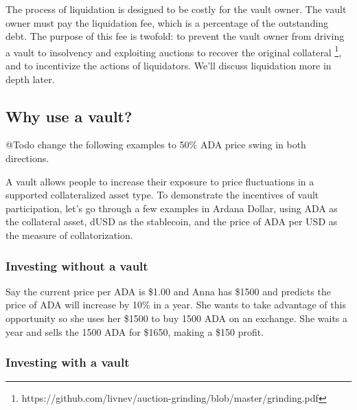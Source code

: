 \documentclass[12pt]{article}
\begin{document}
The process of liquidation is designed to be costly for the vault owner. The vault owner must pay the liquidation fee, which is a percentage of the outstanding debt. The purpose of this fee is twofold: to prevent the vault owner from driving a vault to insolvency and exploiting auctions to recover the original collateral \footnote{https://github.com/livnev/auction-grinding/blob/master/grinding.pdf}, and to incentivize the actions of liquidators. We'll discuss liquidation more in depth later.

\subsection{Why use a vault?}

\begin{flushleft}
	\color{red} @Todo change the following examples to 50\% ADA price swing in both directions.
\end{flushleft}

A vault allows people to increase their exposure to price fluctuations in a supported collateralized asset type. To demonstrate the incentives of vault participation, let's go through a few examples in Ardana Dollar, using ADA as the collateral asset, dUSD as the stablecoin, and the price of ADA per USD as the measure of collatorization.

	\subsubsection{Investing without a vault}

Say the current price per ADA is \$1.00 and Anna has \$1500 and predicts the price of ADA will increase by 10\% in a year. She wants to take advantage of this opportunity so she uses her \$1500 to buy 1500 ADA on an exchange. She waits a year and sells the 1500 ADA for \$1650, making a \$150 profit.

	\subsubsection{Investing with a vault}
\end{document}

